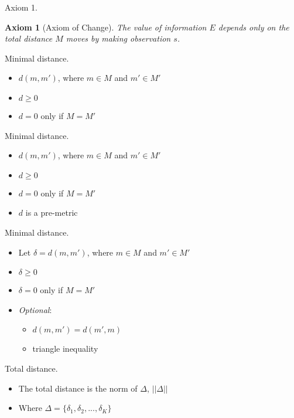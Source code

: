 \documentclass[10pt]{beamer}
\newtheorem{axiom}{Axiom}
\begin{document}
\begin{frame}[fragile]{Axiom 1.}
\begin{axiom}
    [Axiom of Change] The value of information $E$ depends only on the total distance $M$ moves by making observation $s$.
    \label{ax:1} 
\end{axiom}
\end{frame}

\begin{frame}[fragile]{Minimal distance.}
\begin{itemize}
    \item $d(m,m')$, where $m \in M$ and $m' \in M'$
    \item $d \ge 0$
    \item $d = 0$ only if $M = M'$
\end{itemize}
\end{frame}

\begin{frame}[fragile]{Minimal distance.}
\begin{itemize}
    \item $d(m,m')$, where $m \in M$ and $m' \in M'$
    \item $d \ge 0$
    \item $d = 0$ only if $M = M'$
    \item \alert{$d$ is a pre-metric}
\end{itemize}
\end{frame}

\begin{frame}[fragile]{Minimal distance.}
\begin{itemize}
    \item Let $\delta = d(m,m')$, where $m \in M$ and $m' \in M'$
    \item $\delta \ge 0$
    \item $\delta = 0$ only if $M = M'$
    \item \textit{Optional}: 
    \begin{itemize}
        \item $d(m,m') = d(m',m)$ 
        \item triangle inequality
    \end{itemize}
    
\end{itemize}
\end{frame}

\begin{frame}[fragile]{Total distance.}
\begin{itemize}
\item The total distance is the norm of $\Delta$, $||\Delta||$
\item Where $\Delta = \{\delta_1, \delta_2,...,\delta_K\}$
\end{itemize}
\end{frame}
\end{document}

